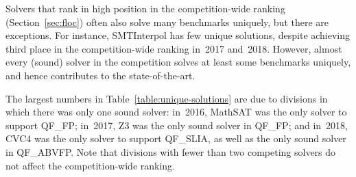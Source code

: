 \documentclass[dvipsnames,table,twoside,11pt]{article}
\begin{document}
Solvers that rank in high position in the competition-wide ranking
(Section~\ref{sec:floc}) often also solve many benchmarks uniquely,
but there are exceptions.  For instance, SMTInterpol has few unique
solutions, despite achieving third place in the competition-wide
ranking in~2017 and~2018.  However, almost every (sound) solver in the
competition solves at least some benchmarks uniquely, and hence
contributes to the state-of-the-art.

The largest numbers in Table~\ref{table:unique-solutions} are due to
divisions in which there was only one sound solver: in~2016, MathSAT
was the only solver to support QF\_FP; in~2017, Z3 was the only sound
solver in QF\_FP; and in~2018, CVC4 was the only solver to support
QF\_SLIA, as well as the only sound solver in QF\_ABVFP.  Note that
divisions with fewer than two competing solvers do not affect the
competition-wide ranking.
\end{document}
